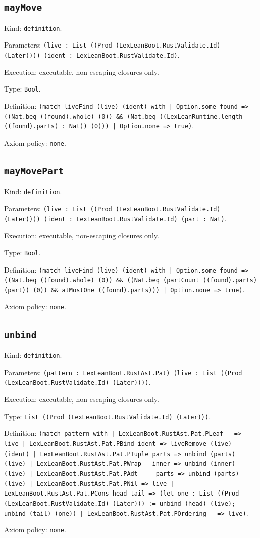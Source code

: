 \documentclass[11pt]{article}
\begin{document}
\subsection*{\texttt{mayMove}}
\noindent Kind: \texttt{definition}.\par
\noindent Parameters: \texttt{(live : List ((Prod (LexLeanBoot.RustValidate.Id) (Later)))) (ident : LexLeanBoot.RustValidate.Id)}.\par
\noindent Execution: executable, non-escaping closures only.\par
\noindent Type: \texttt{Bool}.\par
\noindent Definition: \texttt{(match liveFind (live) (ident) with | Option.some found => ((Nat.beq ((found).whole) (0)) \&\& (Nat.beq ((LexLeanRuntime.length ((found).parts) : Nat)) (0))) | Option.none => true)}.\par
\noindent Axiom policy: \texttt{none}.\par
\subsection*{\texttt{mayMovePart}}
\noindent Kind: \texttt{definition}.\par
\noindent Parameters: \texttt{(live : List ((Prod (LexLeanBoot.RustValidate.Id) (Later)))) (ident : LexLeanBoot.RustValidate.Id) (part : Nat)}.\par
\noindent Execution: executable, non-escaping closures only.\par
\noindent Type: \texttt{Bool}.\par
\noindent Definition: \texttt{(match liveFind (live) (ident) with | Option.some found => ((Nat.beq ((found).whole) (0)) \&\& ((Nat.beq (partCount ((found).parts) (part)) (0)) \&\& atMostOne ((found).parts))) | Option.none => true)}.\par
\noindent Axiom policy: \texttt{none}.\par
\subsection*{\texttt{unbind}}
\noindent Kind: \texttt{definition}.\par
\noindent Parameters: \texttt{(pattern : LexLeanBoot.RustAst.Pat) (live : List ((Prod (LexLeanBoot.RustValidate.Id) (Later))))}.\par
\noindent Execution: executable, non-escaping closures only.\par
\noindent Type: \texttt{List ((Prod (LexLeanBoot.RustValidate.Id) (Later)))}.\par
\noindent Definition: \texttt{(match pattern with | LexLeanBoot.RustAst.Pat.PLeaf \_ => live | LexLeanBoot.RustAst.Pat.PBind ident => liveRemove (live) (ident) | LexLeanBoot.RustAst.Pat.PTuple parts => unbind (parts) (live) | LexLeanBoot.RustAst.Pat.PWrap \_ inner => unbind (inner) (live) | LexLeanBoot.RustAst.Pat.PAdt \_ \_ parts => unbind (parts) (live) | LexLeanBoot.RustAst.Pat.PNil => live | LexLeanBoot.RustAst.Pat.PCons head tail => (let one : List ((Prod (LexLeanBoot.RustValidate.Id) (Later))) := unbind (head) (live); unbind (tail) (one)) | LexLeanBoot.RustAst.Pat.POrdering \_ => live)}.\par
\noindent Axiom policy: \texttt{none}.\par
\end{document}
